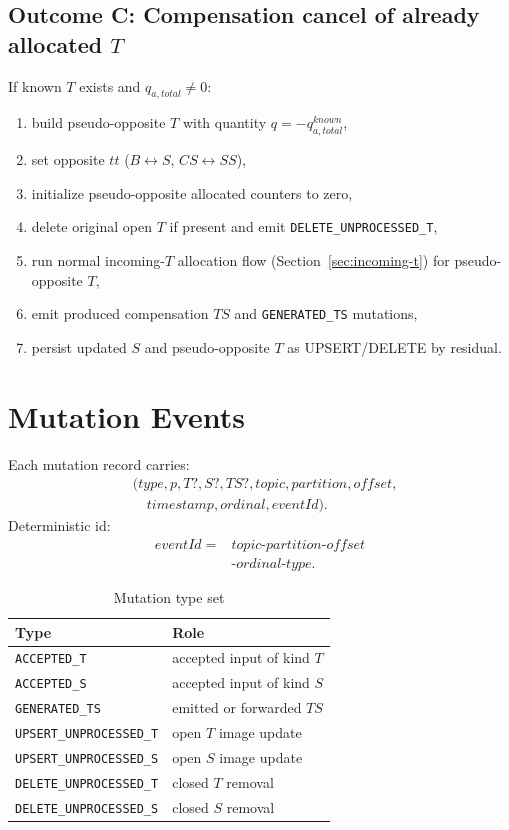 \documentclass[sigconf]{acmart}
\begin{document}
\subsection{Outcome C: Compensation cancel of already allocated $T$}
If known $T$ exists and $q_{a,total}\neq 0$:
\begin{enumerate}[leftmargin=*]
  \item build pseudo-opposite $T$ with quantity $q=-q_{a,total}^{known}$,
  \item set opposite $tt$ ($B\leftrightarrow S$, $CS\leftrightarrow SS$),
  \item initialize pseudo-opposite allocated counters to zero,
  \item delete original open $T$ if present and emit \texttt{DELETE\_UNPROCESSED\_T},
  \item run normal incoming-$T$ allocation flow (Section~\ref{sec:incoming-t}) for pseudo-opposite $T$,
  \item emit produced compensation $TS$ and \texttt{GENERATED\_TS} mutations,
  \item persist updated $S$ and pseudo-opposite $T$ as UPSERT/DELETE by residual.
\end{enumerate}

\section{Mutation Events}
Each mutation record carries:
\[
\begin{aligned}
&(type,p,T?,S?,TS?,topic,partition,offset,\\
&\quad timestamp,ordinal,eventId).
\end{aligned}
\]
Deterministic id:
\[
\begin{aligned}
eventId ={}& topic\text{-}partition\text{-}offset\\
&\text{-}ordinal\text{-}type.
\end{aligned}
\]

\begin{table}[t]
\centering
\caption{Mutation type set}
\begin{tabularx}{\columnwidth}{lY}
\toprule
Type & Role \\
\midrule
\texttt{ACCEPTED\_T} & accepted input of kind $T$ \\
\texttt{ACCEPTED\_S} & accepted input of kind $S$ \\
\texttt{GENERATED\_TS} & emitted or forwarded $TS$ \\
\texttt{UPSERT\_UNPROCESSED\_T} & open $T$ image update \\
\texttt{UPSERT\_UNPROCESSED\_S} & open $S$ image update \\
\texttt{DELETE\_UNPROCESSED\_T} & closed $T$ removal \\
\texttt{DELETE\_UNPROCESSED\_S} & closed $S$ removal \\
\bottomrule
\end{tabularx}
\end{table}
\end{document}
